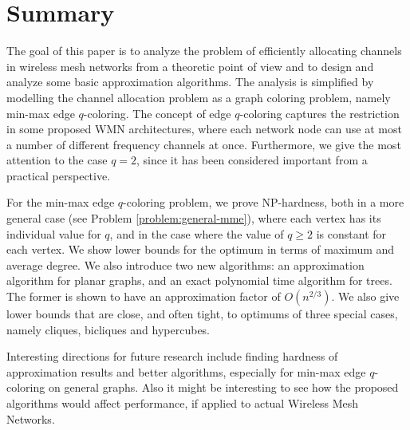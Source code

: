 \documentclass[runningheads, a4paper]{llncs}
\begin{document}
\section{Summary}\label{sect:summary}

The goal of this paper is to analyze the problem of efficiently allocating channels in wireless mesh networks from a theoretic point of view and to design and analyze some basic approximation algorithms. The analysis is simplified by modelling the channel allocation problem as a graph coloring problem, namely min-max edge $q$-coloring. The concept of edge $q$-coloring captures the restriction in some proposed WMN architectures, where each network node can use at most a number of different frequency channels at once. Furthermore, we give the most attention to the case $q=2$, since it has been considered important from a practical perspective.

For the min-max edge $q$-coloring problem, we prove NP-hardness, both in a more general case (see Problem \ref{problem:general-mme}), where each vertex has its individual value for $q$, and in the case where the value of $q \geq 2$ is constant for each vertex.  We show lower bounds for the optimum in terms of maximum and average degree. We also introduce two new algorithms: an approximation algorithm for planar graphs, and an exact polynomial time algorithm for trees. The former is shown to have an approximation factor of $O(n^{2/3})$. 
We also give lower bounds that are close, and often tight, to optimums of three special cases, namely cliques, bicliques and hypercubes.



Interesting directions for future research include finding hardness of approximation results and better algorithms, especially for min-max edge $q$-coloring on general graphs. Also it might be interesting to see how the proposed algorithms would affect performance, if applied to actual Wireless Mesh Networks.



\end{document}
